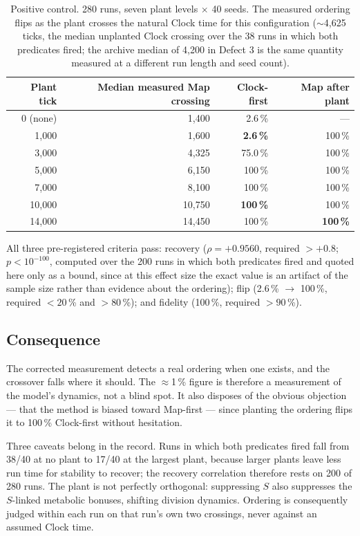 \documentclass[11pt,letterpaper]{article}
\begin{document}
\begin{table}[H]
\centering
\caption{Positive control. 280 runs, seven plant levels $\times$ 40
seeds. The measured ordering flips as the plant crosses the natural
Clock time for this configuration ($\sim$4{,}625 ticks, the median
unplanted Clock crossing over the 38 runs in which both predicates
fired; the archive median of 4{,}200 in Defect 3 is the same quantity
measured at a different run length and seed count).}
\begin{tabular}{rrrr}
\toprule
Plant tick & Median measured Map crossing & Clock-first & Map after plant \\
\midrule
0 (none) & 1{,}400 & 2.6\,\% & --- \\
1{,}000 & 1{,}600 & \textbf{2.6\,\%} & 100\,\% \\
3{,}000 & 4{,}325 & 75.0\,\% & 100\,\% \\
5{,}000 & 6{,}150 & 100\,\% & 100\,\% \\
7{,}000 & 8{,}100 & 100\,\% & 100\,\% \\
10{,}000 & 10{,}750 & \textbf{100\,\%} & 100\,\% \\
14{,}000 & 14{,}450 & 100\,\% & \textbf{100\,\%} \\
\bottomrule
\end{tabular}
\end{table}

All three pre-registered criteria pass: recovery
($\rho = +0.9560$, required $> +0.8$; $p < 10^{-100}$, computed over
the 200 runs in which both predicates fired and quoted here only as a
bound, since at this effect size the exact value is an artifact of the
sample size rather than evidence about the ordering);
flip (2.6\,\% $\to$ 100\,\%, required $< 20$\,\% and $> 80$\,\%);
and fidelity (100\,\%, required $> 90$\,\%).

\subsection{Consequence}

The corrected measurement detects a real ordering when one exists, and
the crossover falls where it should. The $\approx$1\,\% figure is
therefore a measurement of the model's dynamics, not a blind spot. It
also disposes of the obvious objection --- that the method is biased
toward Map-first --- since planting the ordering flips it to 100\,\%
Clock-first without hesitation.

Three caveats belong in the record. Runs in which both predicates fired
fall from 38/40 at no plant to 17/40 at the largest plant, because
larger plants leave less run time for stability to recover; the
recovery correlation therefore rests on 200 of 280 runs. The plant
is not perfectly orthogonal: suppressing $S$ also suppresses the
$S$-linked metabolic bonuses, shifting division dynamics. Ordering is
consequently judged within each run on that run's own two crossings,
never against an assumed Clock time.
\end{document}
